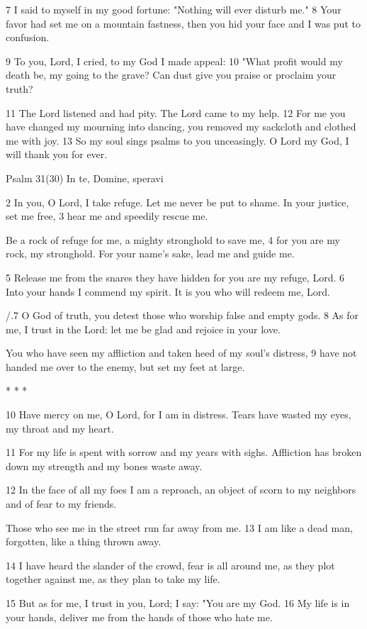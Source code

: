 7 I said to myself in my good fortune:
"Nothing will ever disturb me."
8 Your favor had set me on a mountain fastness,
then you hid your face and I was put to confusion.

9 To you, Lord, I cried,
to my God I made appeal:
10 "What profit would my death be, my going to the grave?
Can dust give you praise or proclaim your truth?

11 The Lord listened and had pity.
The Lord came to my help.
12 For me you have changed my mourning into dancing,
you removed my sackcloth and clothed me with joy.
13 So my soul sings psalms to you unceasingly.
O Lord my God, I will thank you for ever.


Psalm 31(30) In te, Domine, speravi

2 In you, O Lord, I take refuge.
Let me never be put to shame.
In your justice, set me free,
3 hear me and speedily rescue me.

Be a rock of refuge for me,
a mighty stronghold to save me,
4 for you are my rock, my stronghold.
For your name's sake, lead me and guide me.

5 Release me from the snares they have hidden
for you are my refuge, Lord.
6 Into your hands I commend my spirit.
It is you who will redeem me, Lord.

/.7 O God of truth, you detest
those who worship false and empty gods.
8 As for me, I trust in the Lord:
let me be glad and rejoice in your love.

You who have seen my affliction
and taken heed of my soul's distress,
9 have not handed me over to the enemy,
but set my feet at large.

* * *

10 Have mercy on me, O Lord,
for I am in distress.
Tears have wasted my eyes,
my throat and my heart.

11 For my life is spent with sorrow
and my years with sighs.
Affliction has broken down my strength
and my bones waste away.

12 In the face of all my foes
I am a reproach,
an object of scorn to my neighbors
and of fear to my friends.

Those who see me in the street
run far away from me.
13 I am like a dead man, forgotten,
like a thing thrown away.

14 I have heard the slander of the crowd,
fear is all around me,
as they plot together against me,
as they plan to take my life.

15 But as for me, I trust in you, Lord;
I say: "You are my God.
16 My life is in your hands, deliver me
from the hands of those who hate me.

